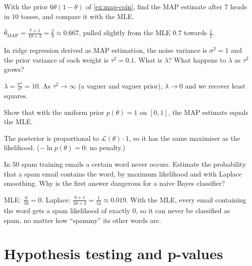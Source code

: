 \sectionexercises

\begin{exercise}
With the prior $6\theta(1 - \theta)$ of \cref{ex:map-coin}, find the MAP estimate
after $7$ heads in $10$ tosses, and compare it with the MLE.
\end{exercise}
\begin{solution}
$\hat\theta_{\mathrm{MAP}} = \tfrac{7 + 1}{10 + 2} = \tfrac23 \approx 0.667$, pulled
slightly from the MLE $0.7$ towards $\tfrac12$.
\end{solution}

\begin{exercise}
In ridge regression derived as MAP estimation, the noise variance is
$\sigma^2 = 1$ and the prior variance of each weight is $\tau^2 = 0.1$. What is
$\lambda$? What happens to $\lambda$ as $\tau^2$ grows?
\end{exercise}
\begin{solution}
$\lambda = \tfrac{\sigma^2}{\tau^2} = 10$. As $\tau^2 \to \infty$ (a vaguer and
vaguer prior), $\lambda \to 0$ and we recover least squares.
\end{solution}

\begin{exercise}
Show that with the uniform prior $p(\theta) = 1$ on $[0, 1]$, the MAP estimate
equals the MLE.
\end{exercise}
\begin{solution}
The posterior is proportional to $\mathcal{L}(\theta)\cdot1$, so it has the same
maximiser as the likelihood. ($-\ln p(\theta) = 0$: no penalty.)
\end{solution}

\begin{exercise}
In $50$ spam training emails a certain word never occurs. Estimate the probability
that a spam email contains the word, by maximum likelihood and with Laplace
smoothing. Why is the first answer dangerous for a naive Bayes classifier?
\end{exercise}
\begin{solution}
MLE: $\tfrac{0}{50} = 0$. Laplace: $\tfrac{0 + 1}{50 + 2} = \tfrac{1}{52} \approx
0.019$. With the MLE, every email containing the word gets a spam likelihood of
exactly $0$, so it can never be classified as spam, no matter how ``spammy'' its
other words are.
\end{solution}

\section{Hypothesis testing and p-values}\label{sec:hypothesis-testing}

